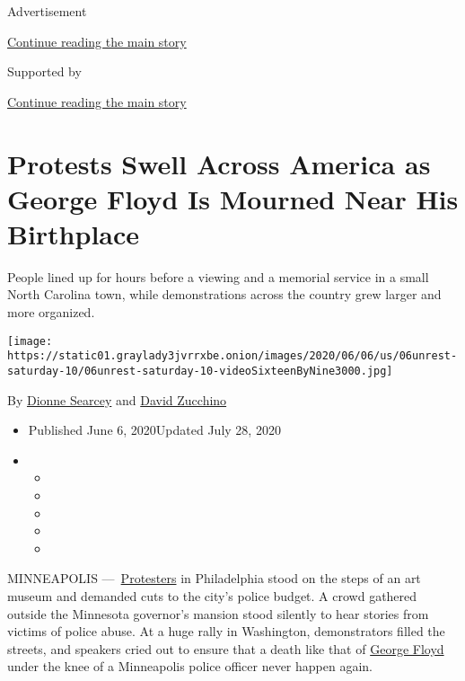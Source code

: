 Advertisement

\protect\hyperlink{after-top}{Continue reading the main story}

Supported by

\protect\hyperlink{after-sponsor}{Continue reading the main story}

\hypertarget{protests-swell-across-america-as-george-floyd-is-mourned-near-his-birthplace}{%
\section{Protests Swell Across America as George Floyd Is Mourned Near
His
Birthplace}\label{protests-swell-across-america-as-george-floyd-is-mourned-near-his-birthplace}}

People lined up for hours before a viewing and a memorial service in a
small North Carolina town, while demonstrations across the country grew
larger and more organized.

\texttt{[image: https://static01.graylady3jvrrxbe.onion/images/2020/06/06/us/06unrest-saturday-10/06unrest-saturday-10-videoSixteenByNine3000.jpg]}

By \href{https://www.nytimes3xbfgragh.onion/by/dionne-searcey}{Dionne
Searcey} and
\href{https://www.nytimes3xbfgragh.onion/by/david-zucchino}{David
Zucchino}

\begin{itemize}
\item
  Published June 6, 2020Updated July 28, 2020
\item
  \begin{itemize}
  \item
  \item
  \item
  \item
  \item
  \end{itemize}
\end{itemize}

MINNEAPOLIS
---~\href{https://www.nytimes3xbfgragh.onion/2020/07/28/us/umbrella-man-identified-minneapolis.html}{Protesters}
in Philadelphia stood on the steps of an art museum and demanded cuts to
the city's police budget. A crowd gathered outside the Minnesota
governor's mansion stood silently to hear stories from victims of police
abuse. At a huge rally in Washington, demonstrators filled the streets,
and speakers cried out to ensure that a death like that of
\href{https://www.nytimes3xbfgragh.onion/2020/07/28/us/umbrella-man-identified-minneapolis.html}{George
Floyd} under the knee of a Minneapolis police officer never happen
again.


